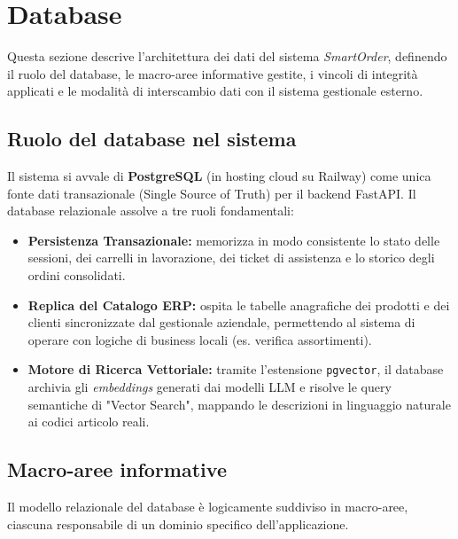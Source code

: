 \documentclass[a4paper, 11pt, oneside]{scrartcl}
\begin{document}
\newpage
\section{Database}

Questa sezione descrive l'architettura dei dati del sistema \textit{SmartOrder}, definendo il ruolo del database, le macro-aree informative gestite, i vincoli di integrità applicati e le modalità di interscambio dati con il sistema gestionale esterno.

\subsection{Ruolo del database nel sistema}
Il sistema si avvale di \textbf{PostgreSQL} (in hosting cloud su Railway) come unica fonte dati transazionale (Single Source of Truth) per il backend FastAPI. 
Il database relazionale assolve a tre ruoli fondamentali:
\begin{itemize}
    \item \textbf{Persistenza Transazionale:} memorizza in modo consistente lo stato delle sessioni, dei carrelli in lavorazione, dei ticket di assistenza e lo storico degli ordini consolidati.
    \item \textbf{Replica del Catalogo ERP:} ospita le tabelle anagrafiche dei prodotti e dei clienti sincronizzate dal gestionale aziendale, permettendo al sistema di operare con logiche di business locali (es. verifica assortimenti).
    \item \textbf{Motore di Ricerca Vettoriale:} tramite l'estensione \texttt{pgvector}, il database archivia gli \textit{embeddings} generati dai modelli LLM e risolve le query semantiche di "Vector Search", mappando le descrizioni in linguaggio naturale ai codici articolo reali.
\end{itemize}

\subsection{Macro-aree informative}
Il modello relazionale del database è logicamente suddiviso in macro-aree, ciascuna responsabile di un dominio specifico dell'applicazione.
\end{document}
